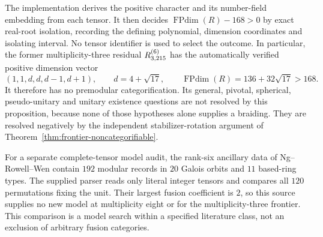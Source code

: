 The implementation derives the positive character and its number-field
embedding from each tensor. It then decides
$\operatorname{FPdim}(R)-168>0$ by exact real-root isolation, recording
the defining polynomial, dimension coordinates and isolating interval.
No tensor identifier is used to select the outcome. In particular,
the former multiplicity-three residual $R^{(6)}_{3,215}$ has the automatically
verified positive dimension vector
\[
 (1,1,d,d,d-1,d+1),\qquad d=4+\sqrt{17},
 \qquad\operatorname{FPdim}(R)=136+32\sqrt{17}>168.
\]
It therefore has no premodular categorification. Its general, pivotal,
spherical, pseudo-unitary and unitary existence questions are not
resolved by this proposition, because none of those hypotheses alone
supplies a braiding. They are resolved negatively by the independent
stabilizer-rotation argument of Theorem~\ref{thm:frontier-noncategorifiable}.

For a separate complete-tensor model audit, the rank-six ancillary data
of Ng--Rowell--Wen \cite{NRW12} contain $192$ modular records in $20$
Galois orbits and $11$ based-ring types. The supplied parser reads only
literal integer tensors and compares all $120$ permutations fixing the
unit. Their largest fusion coefficient is $2$, so this source supplies
no new model at multiplicity eight or for the multiplicity-three
frontier. This comparison is a model search within a specified
literature class, not an exclusion of arbitrary fusion categories.





